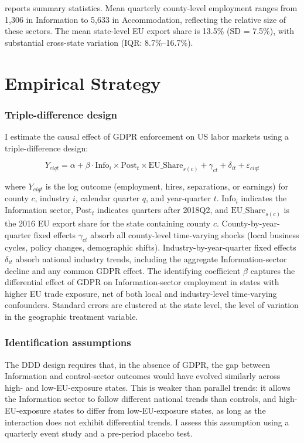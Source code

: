 \documentclass[12pt]{article}
\begin{document}


 reports summary statistics. Mean quarterly county-level employment ranges from 1,306 in Information to 5,633 in Accommodation, reflecting the relative size of these sectors. The mean state-level EU export share is 13.5\% (SD = 7.5\%), with substantial cross-state variation (IQR: 8.7\%--16.7\%).

\section{Empirical Strategy}

\subsubsection*{Triple-difference design} I estimate the causal effect of GDPR enforcement on US labor markets using a triple-difference design:

\begin{equation}
\label{eq:ddd}
Y_{ciqt} = \alpha + \beta \cdot \text{Info}_{i} \times \text{Post}_{t} \times \text{EU\_Share}_{s(c)} + \gamma_{ct} + \delta_{it} + \varepsilon_{ciqt}
\end{equation}

\noindent where $Y_{ciqt}$ is the log outcome (employment, hires, separations, or earnings) for county $c$, industry $i$, calendar quarter $q$, and year-quarter $t$. $\text{Info}_{i}$ indicates the Information sector, $\text{Post}_{t}$ indicates quarters after 2018Q2, and $\text{EU\_Share}_{s(c)}$ is the 2016 EU export share for the state containing county $c$. County-by-year-quarter fixed effects $\gamma_{ct}$ absorb all county-level time-varying shocks (local business cycles, policy changes, demographic shifts). Industry-by-year-quarter fixed effects $\delta_{it}$ absorb national industry trends, including the aggregate Information-sector decline and any common GDPR effect. The identifying coefficient $\beta$ captures the differential effect of GDPR on Information-sector employment in states with higher EU trade exposure, net of both local and industry-level time-varying confounders. Standard errors are clustered at the state level, the level of variation in the geographic treatment variable.

\subsubsection*{Identification assumptions} The DDD design requires that, in the absence of GDPR, the gap between Information and control-sector outcomes would have evolved similarly across high- and low-EU-exposure states. This is weaker than parallel trends: it allows the Information sector to follow different national trends than controls, and high-EU-exposure states to differ from low-EU-exposure states, as long as the interaction does not exhibit differential trends. I assess this assumption using a quarterly event study and a pre-period placebo test.
\end{document}
